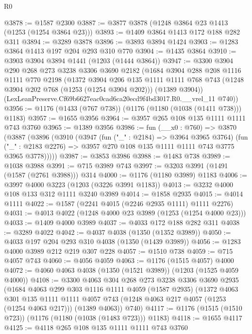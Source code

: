 \begin{lexlean}{R0}
\begin{coremodule}
@3878 := @1587 @2300
@3887 := @3877 @3878 (@1248 @3864 @23 @1413 (@1253 (@1254 @3864 @23)))
@3893 := @1409 @3864 @1413 @172 @188 @282 @311
@3894 := @3289 @3878
@3896 := @3893 @3894 @1424
@3903 := @1283 @3864 @1413 @197 @204 @293 @310 @770
@3904 := @1435 @3864
@3910 := @3903 @3904 @3894 @1441 (@1203 (@1444 @3864))
@3947 := @3300
    @3904
    @290
    @268
    @273
    @3238
    @3306
    @3690
    @2182
    (@1684
      @3904
      @288
      @208
      @1116
      @1111
      @770
      @2198
      (@1372
        @3904
        @206
        @135
        @1111
        @1111
        @768
        @743
        (@1248 @3904 @202 @768 (@1253 (@1254 @3904 @202)))
        (@1389 @3904))
      (LexLeanPreserve.Cf69b6627eac0cad6ca20ecd9f4bd3017.R0.__vrel_11 @740))
@3956 := @1176 (@1433 (@767 @738)) (@1176 (@1180 (@1038 (@1411 @738))) @1183)
@3957 := @1655 @3956
@3964 := @3957 @265 @108 @135 @1111 @1111 @743 @3760
@3965 := @1389 @3956
@3986 := fun (__x0 : @760) =>
  @3870
    (@3887
      (@3896
        (@3910
          (@3947
            (fun ("_" : @2184) => @3964 @3965 @3764)
            (fun ("_" : @2183 @2276) => @3957 @270 @108 @135 @1111 @1111 @743 @3775 @3965 @3778)))))
@3987 := @3853 @3986
@3988 := @1483 @738
@3989 := @1038 @3988
@3991 := @715 @3989 @743
@3997 := @3203 @3991 (@1491 (@1587 (@2761 @3988))) @314
@4000 := @1176 (@1180 @3989) @1183
@4006 := @3997 @4000 @3223 (@1203 (@3226 @3991 @1183))
@4013 := @3232 @4000 @108 @133 @312 @1111 @3240 @3989
@4014 := @1858 @2935
@4015 := @4014 @1111
@4022 := @1587 (@2241 @4015 (@2246 @2935 @1111) @1111 @2276)
@4031 := @4013 @4022 (@1248 @4000 @23 @3989 (@1253 (@1254 @4000 @23)))
@4033 := @1409 @4000 @3989
@4037 := @4033 @172 @188 @282 @311
@4038 := @3289 @4022
@4042 := @4037 @4038 (@1350 (@1352 @3989))
@4050 := @4033 @197 @204 @293 @310 @4038 (@1350 (@1439 @3989))
@4056 := @1283 @4000 @3989 @212 @219 @307 @228
@4057 := @1510 @738
@4059 := @715 @4057 @743
@4060 := @4056 @4059
@4063 := @1176 (@1515 @4057) @4000
@4072 := @4060 @4063 @4038 (@1350 (@1521 @3989)) (@1203 (@1525 @4059 @4000))
@4108 := @3300
    @4063
    @304
    @268
    @273
    @3238
    @3306
    @3690
    @2935
    (@1684
      @4063
      @299
      @303
      @1116
      @1111
      @4059
      (@1587 @2935)
      (@1372
        @4063
        @301
        @135
        @1111
        @1111
        @4057
        @743
        (@1248 @4063 @217 @4057 (@1253 (@1254 @4063 @217)))
        (@1389 @4063))
      @740)
@4117 := @1176 (@1515 (@1510 @723)) (@1176 (@1180 (@1038 (@1483 @723))) @1183)
@4118 := @1655 @4117
@4125 := @4118 @265 @108 @135 @1111 @1111 @743 @3760

\end{coremodule}
\end{lexlean}
